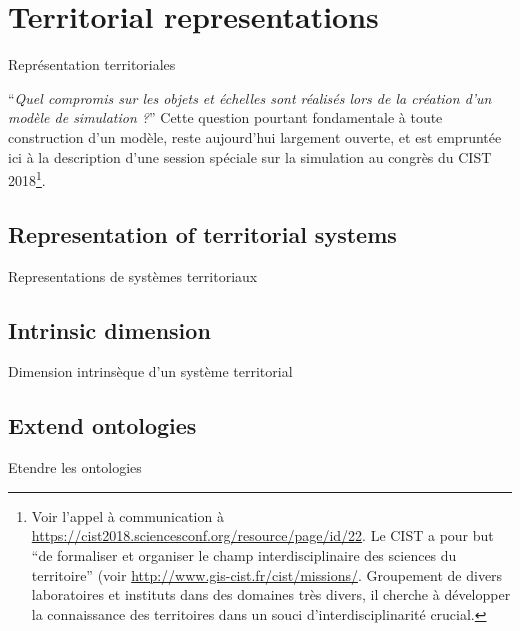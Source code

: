 \newpage

\section{Territorial representations}{Représentation territoriales}





``\textit{Quel compromis sur les objets et échelles sont réalisés lors de la création d'un modèle de simulation ?}'' Cette question pourtant fondamentale à toute construction d'un modèle, reste aujourd'hui largement ouverte, et est empruntée ici à la description d'une session spéciale sur la simulation au congrès du CIST 2018\footnote{Voir l'appel à communication à \url{https://cist2018.sciencesconf.org/resource/page/id/22}. Le CIST a pour but ``de formaliser et organiser le champ interdisciplinaire des sciences du territoire'' (voir \url{http://www.gis-cist.fr/cist/missions/}. Groupement de divers laboratoires et instituts dans des domaines très divers, il cherche à développer la connaissance des territoires dans un souci d'interdisciplinarité crucial.}.


\subsection{Representation of territorial systems}{Representations de systèmes territoriaux}





\subsection{Intrinsic dimension}{Dimension intrinsèque d'un système territorial}








\subsection{Extend ontologies}{Etendre les ontologies}









\stars

